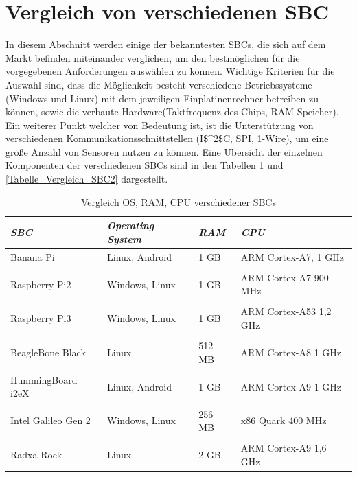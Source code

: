 \section{Vergleich von verschiedenen SBC}
\label{section_Vergleich_SBC}
In diesem Abschnitt werden einige der bekanntesten \acp{SBC}, die sich auf dem Markt befinden miteinander verglichen, um den bestmöglichen für die vorgegebenen Anforderungen auswählen zu können.
Wichtige Kriterien für die Auswahl sind, dass die Möglichkeit besteht verschiedene Betriebssysteme (Windows und Linux) mit dem jeweiligen Einplatinenrechner betreiben zu können, sowie die verbaute Hardware(Taktfrequenz des Chips, RAM-Speicher). Ein weiterer Punkt welcher von Bedeutung ist, ist die Unterstützung von verschiedenen Kommunikationsschnittstellen (\ac{I$^2$C}, \ac{SPI}, 1-Wire), um eine große Anzahl von Sensoren nutzen zu können. Eine Übersicht der einzelnen Komponenten der verschiedenen \acp{SBC} sind in den Tabellen \ref{Tabelle_Vergleich_SBC1} und \ref{Tabelle_Vergleich_SBC2} dargestellt.

\begin{table}[H]
\centering
\begin{tabular}{
llll
}
\toprule
\multicolumn{1}{p{3cm}}{\textit{\ac{SBC}}} & \multicolumn{1}{p{3.5cm}}{\textit{Operating System} } & \multicolumn{1}{p{1,5cm}}{\textit{RAM} }&\multicolumn{1}{p{3cm}}{ \centering\textit{CPU} }\\\midrule
Banana Pi & Linux, Android & 1 GB & ARM Cortex-A7, 1 GHz\\
&&&\\
Raspberry Pi2&Windows, Linux&1 GB&ARM Cortex-A7 900 MHz\\
&&&\\
Raspberry Pi3&Windows, Linux&1 GB&ARM Cortex-A53 1,2 GHz\\
&&&\\
BeagleBone Black & Linux & 512 MB & ARM Cortex-A8 1 GHz\\
&&&\\
HummingBoard i2eX & Linux, Android & 1 GB & ARM Cortex-A9 1 GHz\\
&&&\\
Intel Galileo Gen 2 & Windows, Linux & 256 MB & x86 Quark 400 MHz\\
&&&\\
Radxa Rock & Linux & 2 GB & ARM Cortex-A9 1,6 GHz\\
\bottomrule
\end{tabular}
\caption{Vergleich OS, RAM, CPU verschiedener SBCs}
\label{Tabelle_Vergleich_SBC1}
\end{table}

